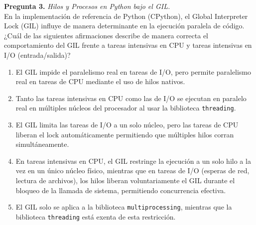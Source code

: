 \documentclass[12pt,letterpaper]{article}
\begin{document}
\bigskip

\textbf{Pregunta 3.} \textit{Hilos y Procesos en Python bajo el GIL.} \\
En la implementación de referencia de Python (CPython), el Global Interpreter Lock (GIL) influye de manera determinante en la ejecución paralela de código. ¿Cuál de las siguientes afirmaciones describe de manera correcta el comportamiento del GIL frente a tareas intensivas en CPU y tareas intensivas en I/O (entrada/salida)?
\begin{enumerate}[label=\alph*)]
  \item El GIL impide el paralelismo real en tareas de I/O, pero permite paralelismo real en tareas de CPU mediante el uso de hilos nativos.
  \item Tanto las tareas intensivas en CPU como las de I/O se ejecutan en paralelo real en múltiples núcleos del procesador al usar la biblioteca \texttt{threading}.
  \item El GIL limita las tareas de I/O a un solo núcleo, pero las tareas de CPU liberan el lock automáticamente permitiendo que múltiples hilos corran simultáneamente.
  \item En tareas intensivas en CPU, el GIL restringe la ejecución a un solo hilo a la vez en un único núcleo físico, mientras que en tareas de I/O (esperas de red, lectura de archivos), los hilos liberan voluntariamente el GIL durante el bloqueo de la llamada de sistema, permitiendo concurrencia efectiva.
  \item El GIL solo se aplica a la biblioteca \texttt{multiprocessing}, mientras que la biblioteca \texttt{threading} está exenta de esta restricción.
\end{enumerate}

\bigskip
\end{document}
